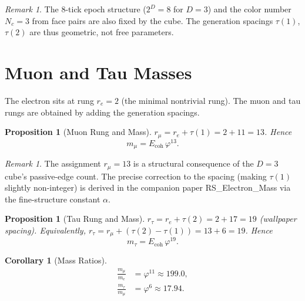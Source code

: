 \documentclass[12pt,a4paper]{article}
\newtheorem{corollary}[theorem]{Corollary}
\newtheorem{proposition}[theorem]{Proposition}
\theoremstyle{definition}
\theoremstyle{remark}
\newtheorem{remark}[theorem]{Remark}
\begin{document}
\begin{remark}
The 8-tick epoch structure ($2^D = 8$ for $D = 3$) and the color
number $N_c = 3$ from face pairs are also fixed by the cube.  The
generation spacings $\tau(1)$, $\tau(2)$ are thus geometric, not
free parameters.
\end{remark}

\section{Muon and Tau Masses}
\label{sec:masses}

The electron sits at rung $r_e = 2$ (the minimal nontrivial rung).
The muon and tau rungs are obtained by adding the generation spacings.

\begin{proposition}[Muon Rung and Mass]
\label{thm:muon}
$r_\mu = r_e + \tau(1) = 2 + 11 = 13$.  Hence
\begin{equation}
  m_\mu = E_{\mathrm{coh}} \,\varphi^{13}.
\end{equation}
\end{proposition}

\begin{remark}
The assignment $r_\mu = 13$ is a structural consequence of the $D=3$
cube's passive-edge count.  The precise correction to the spacing
(making $\tau(1)$ slightly non-integer) is derived in the companion
paper RS\_Electron\_Mass via the fine-structure constant $\alpha$.
\end{remark}

\begin{proposition}[Tau Rung and Mass]
\label{thm:tau}
$r_\tau = r_e + \tau(2) = 2 + 17 = 19$ (wallpaper spacing).  Equivalently,
$r_\tau = r_\mu + (\tau(2) - \tau(1)) = 13 + 6 = 19$.  Hence
\begin{equation}
  m_\tau = E_{\mathrm{coh}} \,\varphi^{19}.
\end{equation}
\end{proposition}

\begin{corollary}[Mass Ratios]
\label{cor:ratios}
\begin{align}
  \frac{m_\mu}{m_e} &= \varphi^{11} \approx 199.0, \\
  \frac{m_\tau}{m_\mu} &= \varphi^{6} \approx 17.94.
\end{align}
\end{corollary}
\end{document}

